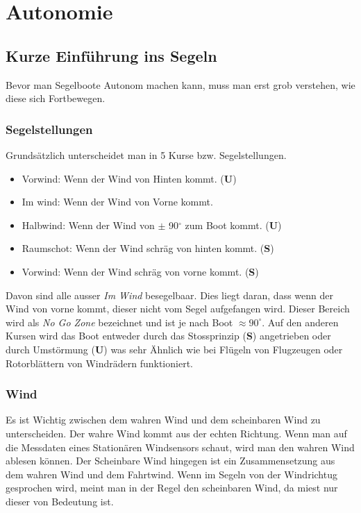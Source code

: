 
\chapter{Autonomie}
\label{chap:autonomie}


\section{Kurze Einführung ins Segeln}
Bevor man Segelboote Autonom machen kann, muss man erst grob verstehen, wie diese sich Fortbewegen. 
\subsection{Segelstellungen}
Grundsätzlich unterscheidet man in 5 Kurse bzw. Segelstellungen.
\begin{itemize}
    \item Vorwind: Wenn der Wind von Hinten kommt. (\textbf{U})
    \item Im wind: Wenn der Wind von Vorne kommt.
    \item Halbwind: Wenn der Wind von $\pm$ 90$^{\circ}$ zum Boot kommt. (\textbf{U})
    \item Raumschot: Wenn der Wind schräg von hinten kommt. (\textbf{S})
    \item Vorwind: Wenn der Wind schräg von vorne kommt. (\textbf{S})
\end{itemize}

Davon sind alle ausser \textit{Im Wind} besegelbaar. Dies liegt daran, dass wenn der Wind von vorne kommt, dieser nicht vom Segel aufgefangen wird. Dieser Bereich wird als \textit{No Go Zone} bezeichnet und ist je nach Boot $\approx 90^{\circ}$. Auf den anderen Kursen wird das Boot entweder durch das Stossprinzip (\textbf{S}) angetrieben oder durch Umstörmung (\textbf{U}) was sehr Ähnlich wie bei Flügeln von Flugzeugen oder Rotorblättern von Windrädern funktioniert.  
\subsection{Wind}
Es ist Wichtig zwischen dem wahren Wind und dem scheinbaren Wind zu unterscheiden. Der wahre Wind kommt aus der echten Richtung. Wenn man auf die Messdaten eines Stationären Windsensors schaut, wird man den wahren Wind ablesen können. Der Scheinbare Wind hingegen ist ein Zusammensetzung aus dem wahren Wind und dem Fahrtwind. Wenn im Segeln von der Windrichtug gesprochen wird, meint man in der Regel den scheinbaren Wind, da miest nur dieser von Bedeutung ist. 

